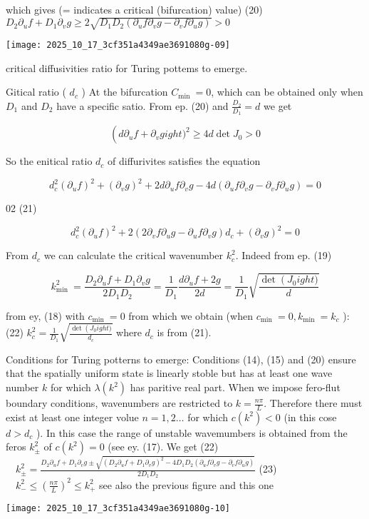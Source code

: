 which gives (= indicates a critical (bifurcation) value)
(20) $D_{2} \partial_{u} f+D_{1} \partial_{v} g \geqslant 2 \sqrt{D_{1} D_{2}
\left(\partial_{u} f \partial_{v} g-\partial_{v} f \partial_{u} g\right)}>0$
\begin{center}
\texttt{[image: 2025\_10\_17\_3cf351a4349ae3691080g-09]}
\end{center}
critical diffusivities ratio for Turing pottems to emerge.

Gitical ratio ( $d_{c}$ )
At the bifurcation $C_{\text {min }}=0$, which can be obtained only when $D_{1}$ and $D_{2}$ have a specific satio. From ep. (20) and $\frac{D_{2}}{D_{1}}=d$ we get

$$ 
\left(d \partial_{u} f+\partial_{v} g
ight)^{2} \geqslant 4 d \operatorname{det} J_{0}>0
$$ 

So the enitical ratio $d_{c}$ of diffurivites satisfies the equation

$$ 
d_{c}^{2}\left(\partial_{u} f
\right)^{2}+\left(\partial_{v} g
\right)^{2}+2 d \partial_{u} f \partial_{v} g-4 d\left(\partial_{u} f \partial_{v} g-\partial_{v} f \partial_{u} g
\right)=0
$$ 

02
(21)

$$ 
d_{c}^{2}\left(\partial_{u} f
\right)^{2}+2
\left(2 \partial_{v} f \partial_{u} g-\partial_{u} f \partial_{v} g
\right) d_{c}+\left(\partial_{v} g
\right)^{2}=0
$$ 

From $d_{c}$ we can calculate the critical wavenumber $k_{c}^{2}$. Indeed from ep. (19)

$$ 
k_{\text {min }}^{2}=\frac{D_{2} \partial_{u} f+D_{1} \partial_{v} g}{2 D_{1} D_{2}}=\frac{1}{D_{1}} \frac{d \partial_{u} f+2 g}{2 d}=\frac{1}{D_{1}} \sqrt{\frac{\operatorname{det}
\left(J_{0}
ight)}{d}}
$$ 

from ey, (18) with $c_{\text {min }}=0$
from which we obtain (when $c_{\text {min }}=0, k_{\text {min }}=k_{c}$ ):
(22) $k_{c}^{2}=\frac{1}{D_{1}} \sqrt{\frac{\operatorname{det}
\left(J_{0}
ight)}{d_{c}}}$ where $d_{c}$ is from (21).

Conditions for Turing potterns to emerge:
Conditions (14), (15) and (20) ensure that the spatially uniform state is linearly stoble but has at least one wave number $k$ for which $\lambda
\left(k^{2}
\right)$ has paritive real part.
When we impose fero-flut boundary conditions, wavenumbers are restricted to $k=\frac{n \pi}{L}$. Therefore there must exist at least one integer volue $n=1,2 \ldots$ for which $c
\left(k^{2}
\right)<0$ (in this cose $d>d_{c}$ ). In this case the range of unstable wavemumbers is obtained from the feros $k_{ \pm}^{2}$ of $c
\left(k^{2}
\right)=0$ (see ey. (17). We get
(22) $\quad k_{ \pm}^{2}=\frac{D_{2} \partial_{u} f+D_{1} \partial_{v} g \pm \sqrt{\left(D_{2} \partial_{u} f+D_{1} \partial_{v} g
\right)^{2}-4 D_{1} D_{2}\left(\partial_{u} f \partial_{v} g-\partial_{v} f \partial_{u} g
\right)}}{2 D_{1} D_{2}}$
(23) $\quad k_{-}^{2} \leqslant\left(\frac{n \pi}{L}
\right)^{2} \leqslant k_{+}^{2}$
see also the previous figure and this one
\begin{center}
\texttt{[image: 2025\_10\_17\_3cf351a4349ae3691080g-10]}
\end{center}

